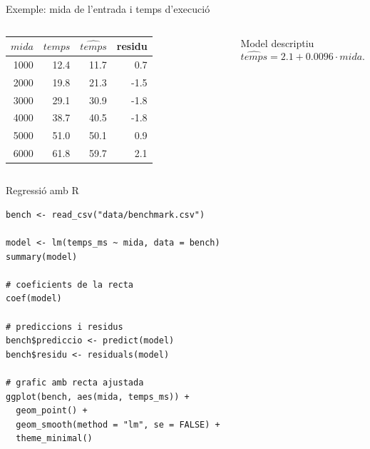 \documentclass[10pt,aspectratio=169]{beamer}
\begin{document}
\begin{frame}{Exemple: mida de l'entrada i temps d'execució}
\begin{columns}[T]
\small
\begin{tabular}{rrrr}
\toprule
$mida$ & $temps$ & $\widehat{temps}$ & residu \\
\midrule
1000 & 12.4 & 11.7 & 0.7 \\
2000 & 19.8 & 21.3 & -1.5 \\
3000 & 29.1 & 30.9 & -1.8 \\
4000 & 38.7 & 40.5 & -1.8 \\
5000 & 51.0 & 50.1 & 0.9 \\
6000 & 61.8 & 59.7 & 2.1 \\
\bottomrule
\end{tabular}
\vspace{0.25cm}
\begin{block}{Model descriptiu}
\[
 \widehat{temps}=2.1+0.0096\cdot mida.
\]
\end{block}
\centering
{}
\end{columns}
\end{frame}

\begin{frame}[fragile]{Regressió amb R}
\begin{lstlisting}
bench <- read_csv("data/benchmark.csv")

model <- lm(temps_ms ~ mida, data = bench)
summary(model)

# coeficients de la recta
coef(model)

# prediccions i residus
bench$prediccio <- predict(model)
bench$residu <- residuals(model)

# grafic amb recta ajustada
ggplot(bench, aes(mida, temps_ms)) +
  geom_point() +
  geom_smooth(method = "lm", se = FALSE) +
  theme_minimal()
\end{lstlisting}
\end{frame}
\end{document}
